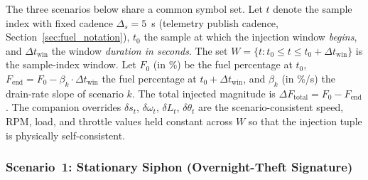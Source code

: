The three scenarios below share a common symbol set. Let $t$ denote the sample index with fixed cadence $\Delta_s = 5$~s (telemetry publish cadence, Section~\ref{sec:fuel_notation}), $t_0$ the sample at which the injection window \emph{begins}, and $\Delta t_{\mathrm{win}}$ the window \emph{duration in seconds}. The set $W = \{t : t_0 \leq t \leq t_0 + \Delta t_{\mathrm{win}}\}$ is the sample-index window. Let $F_0$ (in \%) be the fuel percentage at $t_0$, $F_{\mathrm{end}} = F_0 - \beta_k \cdot \Delta t_{\mathrm{win}}$ the fuel percentage at $t_0 + \Delta t_{\mathrm{win}}$, and $\beta_k$ (in \%/s) the drain-rate slope of scenario $k$. The total injected magnitude is $\Delta F_{\mathrm{total}} = F_0 - F_{\mathrm{end}}$. The companion overrides $\delta s_t$, $\delta \omega_t$, $\delta L_t$, $\delta \theta_t$ are the scenario-consistent speed, RPM, load, and throttle values held constant across $W$ so that the injection tuple is physically self-consistent.

\subsubsection{Scenario~1: Stationary Siphon (Overnight-Theft Signature)}
\label{sec:inject_scenario1}

